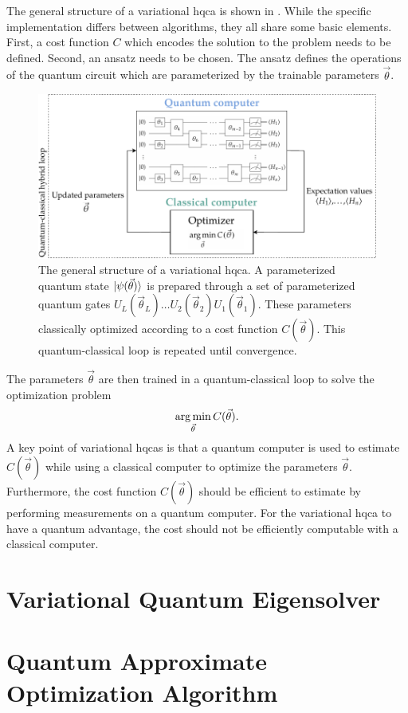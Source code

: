 The general structure of a variational \gls{hqca} is shown in .
While the specific implementation differs between algorithms, they all share some basic elements.
First, a cost function $C$ which encodes the solution to the problem needs to be defined.
Second, an ansatz needs to be chosen.
The ansatz defines the operations of the quantum circuit which are parameterized by the trainable parameters $\vec{\theta}$.
\begin{figure}[ht]
    \centering
    \includegraphics[width=1\linewidth]{figures/vqa-general-structure.pdf}
    \caption[The general structure of a variational \acrshort{hqca}.]{The general structure of a variational \gls{hqca}. A parameterized quantum state $\vert{\psi(\vec{\theta})}\rangle$ is prepared through a set of parameterized quantum gates $U_L(\vec{\theta}_L) \ldots U_2(\vec{\theta}_2)U_1(\vec{\theta}_1)$. These parameters classically optimized according to a cost function $C(\vec{\theta})$. This quantum-classical loop is repeated until convergence.}
    \label{fig:vqa-general-structure}
\end{figure}
The parameters $\vec{\theta}$ are then trained in a quantum-classical loop to solve the optimization problem
\begin{equation}
\operatorname*{arg\,min}_{\vec{\theta}} C(\vec{\theta}).
\end{equation}
A key point of variational \glspl{hqca} is that a quantum computer is used to estimate $C(\vec{\theta})$ while using a classical computer to optimize the parameters $\vec{\theta}$.
Furthermore, the cost function $C(\vec{\theta})$ should be efficient to estimate by performing measurements on a quantum computer.
For the variational \gls{hqca} to have a quantum advantage, the cost should not be efficiently computable with a classical computer.


\section{Variational Quantum Eigensolver}

\section{Quantum Approximate Optimization Algorithm}